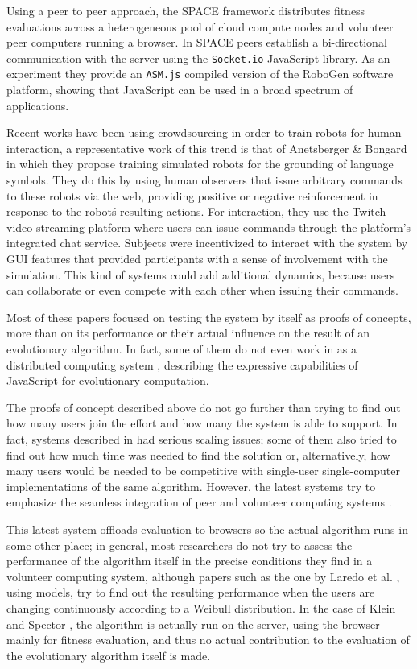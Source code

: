 \documentclass{llncs}
\begin{document}
Using a peer to peer approach, the SPACE framework \cite{leclerc2016seamless} distributes fitness 
evaluations across a heterogeneous pool of cloud compute nodes and volunteer
peer computers running a browser. In SPACE peers establish a bi-directional 
communication with the server using the \texttt{Socket.io} JavaScript library.  
As an experiment they provide an \texttt{ASM.js} compiled version of the RoboGen 
software platform, showing that JavaScript can be used in a broad 
spectrum of applications.  

Recent works have been using crowdsourcing in order to train robots 
for human interaction, a representative work of this trend is that of  
Anetsberger \& Bongard \cite{anetsbergerrobots} in which they propose 
training simulated robots for the grounding of language symbols. They do this by using human 
observers that issue arbitrary commands to these robots via the web, 
providing positive or negative reinforcement in response to the
robot\'s resulting actions. For interaction, they use the Twitch 
video streaming platform where users can issue commands through the
platform's integrated chat service. Subjects were incentivized to 
interact with the system by GUI features that provided participants
with a sense of involvement with the simulation. This kind of systems
could add additional dynamics, because users can collaborate or 
even compete with each other when issuing their commands.


Most
of these papers focused on testing the system by itself as proofs of
concepts, more than on its performance or their actual influence on
the result of an evolutionary algorithm. In fact, some of them do not
even work in as a distributed computing system
\cite{EvoStar2014:jsEO}, describing the expressive capabilities of
JavaScript for evolutionary computation. 


The proofs of concept described above do not go further than trying to
find out  how many users join the effort and how many the system is
able to support. In fact, systems described in
\cite{gecco07:workshop:dcor} had serious scaling issues; some of them
also tried to find out how much time was needed to find the solution
or, alternatively, how many users would be needed to be competitive
with single-user single-computer implementations of the same
algorithm. However, the latest systems try to emphasize the seamless
integration of peer and volunteer computing systems \cite{leclerc2016seamless}. 

This latest system offloads evaluation to browsers so the actual
algorithm runs in some other place; in general, most researchers do
not try to assess the performance of the algorithm 
itself in the precise conditions they find in a volunteer computing
system, although papers such as the one by Laredo et
al. \cite{churn08:ijhpsa}, using models, try to find out the resulting
performance when the users are changing continuously according to a
Weibull distribution. In the case of Klein and Spector \cite{unwitting-ec}, the algorithm
is actually run on the server, using the browser mainly for fitness
evaluation, and thus no actual contribution to the evaluation of the
evolutionary algorithm itself is made.
\end{document}
